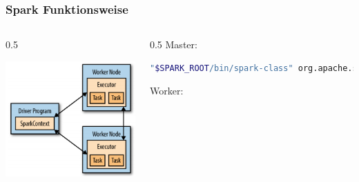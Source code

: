 \begin{frame}[fragile]
    \frametitle{Spark Funktionsweise}
    \begin{columns}\begin{column}{0.5\linewidth}
    \centerline{\includegraphics[width=\linewidth]{spark-components-execution.png}}
    \end{column}\begin{column}{0.5\linewidth}
    Master:
    \begin{lstlisting}[language=bash,numbers=none,xleftmargin=0pt,linewidth=1.05\linewidth,basicstyle=\scriptsize]
"$SPARK_ROOT/bin/spark-class" org.apache.spark.deploy.master.Master --ip $(hostname) --port 7077 --webui-port 8080
\end{lstlisting}\vspace{-1.5\baselineskip}
    Worker:
    \begin{lstlisting}[language=bash,numbers=none,xleftmargin=0pt,linewidth=1.05\linewidth,basicstyle=\scriptsize]

\end{lstlisting}
\end{column}
\end{columns}
\end{frame}
